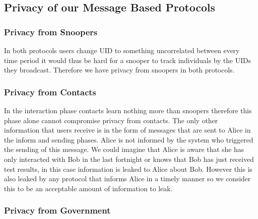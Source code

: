 \documentclass{article}
\begin{document}

\subsection{Privacy of our Message Based Protocols} \label{sec:privacy of messaged based}

\subsubsection{Privacy from Snoopers}

In both protocols users change UID to something uncorrelated between every time period it would thus be hard for a snooper to track individuals by the UIDs they broadcast. Therefore we have privacy from snoopers in both protocols.

\subsubsection{Privacy from Contacts}

In the interaction phase contacts learn nothing more than snoopers therefore this phase alone cannot compromise privacy from contacts. The only other information that users receive is in the form of messages that are sent to Alice in the inform and sending phases. Alice is not informed by the system who triggered the sending of this message. We could imagine that Alice is aware that she has only interacted with Bob in the last fortnight or knows that Bob has just received test results, in this case information is leaked to Alice about Bob. However this is also leaked by any protocol that informs Alice in a timely manner so we consider this to be an acceptable amount of information to leak.

\subsubsection{Privacy from Government}
\end{document}
